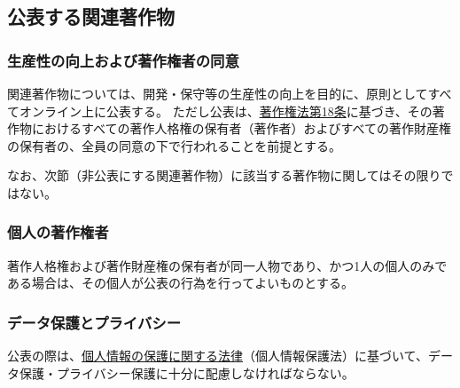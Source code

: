 \subsection{公表する関連著作物}

\subsubsection{生産性の向上および著作権者の同意}
関連著作物については、開発・保守等の生産性の向上を目的に、原則としてすべてオンライン上に公表する。
ただし公表は、\href{https://elaws.e-gov.go.jp/document?lawid=345AC0000000048\#Mp-At_2}{著作権法第18条}に基づき、その著作物におけるすべての著作人格権の保有者（著作者）およびすべての著作財産権の保有者の、全員の同意の下で行われることを前提とする。

なお、次節（非公表にする関連著作物）に該当する著作物に関してはその限りではない。

\subsubsection{個人の著作権者\label{subsec:individualholder}}
著作人格権および著作財産権の保有者が同一人物であり、かつ1人の個人のみである場合は、その個人が公表の行為を行ってよいものとする。

\subsubsection{データ保護とプライバシー}
公表の際は、\href{https://elaws.e-gov.go.jp/document?lawid=415AC0000000057}{個人情報の保護に関する法律}（個人情報保護法）\cite{eGovPersonalInfoProtectionLaw}に基づいて、データ保護・プライバシー保護に十分に配慮しなければならない。


